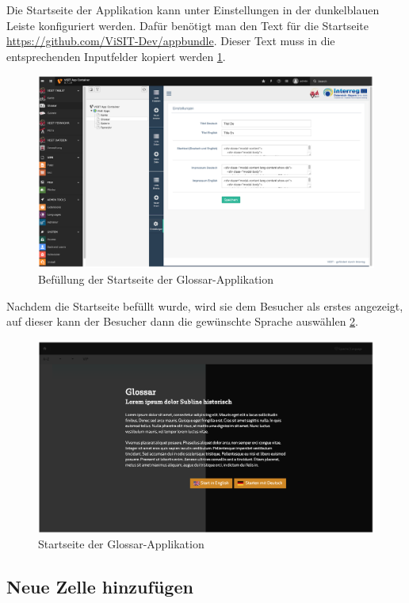 Die Startseite der Applikation kann unter Einstellungen in der dunkelblauen Leiste konfiguriert werden. Dafür benötigt man den Text für die Startseite \url{https://github.com/ViSIT-Dev/appbundle}. Dieser Text muss in die entsprechenden Inputfelder kopiert werden \ref{img:startseite_glossar}.

\begin{figure}[ht!]
\centering
\includegraphics[width=12cm]{Figures/paula/glossar/startseite_glossar.png}
\caption{Befüllung der Startseite der Glossar-Applikation}
\label{img:startseite_glossar}
\end{figure}

Nachdem die Startseite befüllt wurde, wird sie dem Besucher als erstes angezeigt, auf dieser kann der Besucher dann die gewünschte Sprache auswählen \ref{img:startseite_glossar_tablet}.

\begin{figure}[ht!]
\centering
\includegraphics[width=12cm]{Figures/paula/glossar/startseite_glossar_tablet.png}
\caption{Startseite der Glossar-Applikation}
\label{img:startseite_glossar_tablet}
\end{figure}


\subsection{Neue Zelle hinzufügen}

